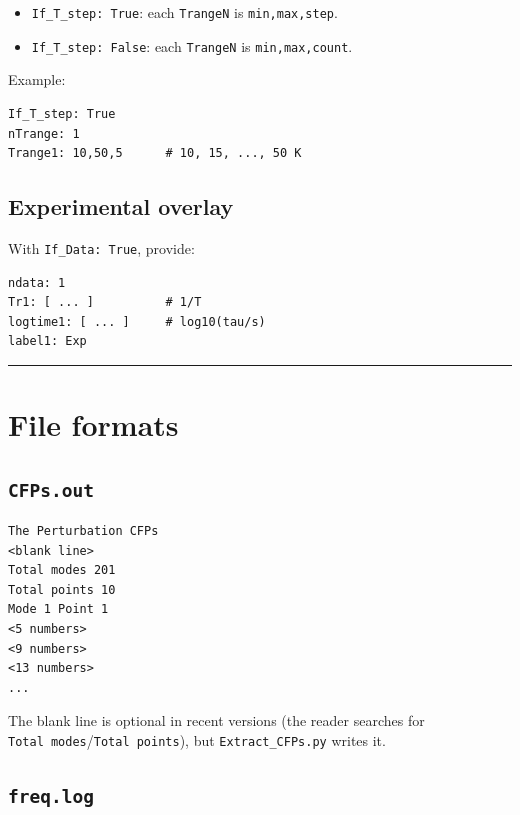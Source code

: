\documentclass[11pt,a4paper]{article}
\providecommand{\tightlist}{%
  \setlength{\itemsep}{0pt}\setlength{\parskip}{0pt}}
\providecommand{\texorpdfstring}[2]{#1}
\begin{document}
\begin{itemize}
\tightlist
\item
  \texttt{If\_T\_step:\ True}: each \texttt{TrangeN} is
  \texttt{min,max,step}.
\item
  \texttt{If\_T\_step:\ False}: each \texttt{TrangeN} is
  \texttt{min,max,count}.
\end{itemize}

Example:

\begin{lstlisting}
If_T_step: True
nTrange: 1
Trange1: 10,50,5      # 10, 15, ..., 50 K
\end{lstlisting}

\subsection{Experimental overlay}\label{experimental-overlay}

With \texttt{If\_Data:\ True}, provide:

\begin{lstlisting}
ndata: 1
Tr1: [ ... ]          # 1/T
logtime1: [ ... ]     # log10(tau/s)
label1: Exp
\end{lstlisting}

\begin{center}\rule{0.5\linewidth}{0.4pt}\end{center}

\section{File formats}\label{file-formats}

\subsection{\texorpdfstring{\texttt{CFPs.out}}{7.1 CFPs.out}}\label{cfps.out}

\begin{lstlisting}
The Perturbation CFPs
<blank line>
Total modes 201
Total points 10
Mode 1 Point 1
<5 numbers>
<9 numbers>
<13 numbers>
...
\end{lstlisting}

The blank line is optional in recent versions (the reader searches for
\texttt{Total\ modes}/\texttt{Total\ points}), but
\texttt{Extract\_CFPs.py} writes it.

\subsection{\texorpdfstring{\texttt{freq.log}}{7.2 freq.log}}\label{freq.log}
\end{document}
